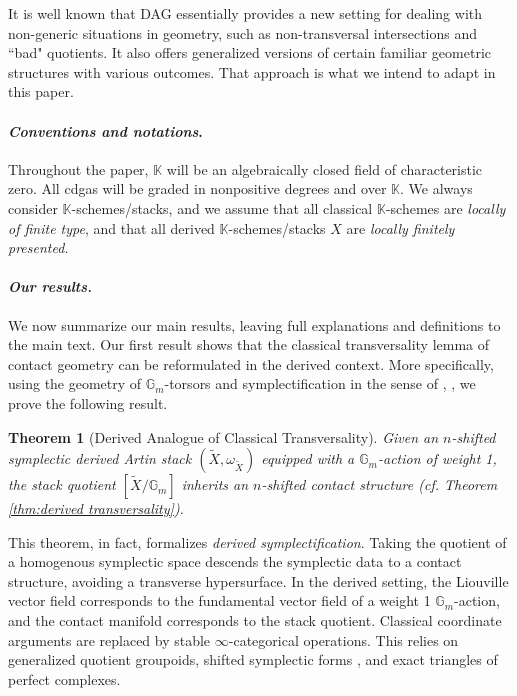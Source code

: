 \documentclass[reqno]{amsart}
\newtheorem{theorem}{Theorem}[section]
\theoremstyle{definition}
\theoremstyle{remark}
\newcommand{\Gm}{\mathbb{G}_m}
\newcommand{\K}{\mathbb{K}}
\newcommand{\bfem}[1]{\textbf{\textit{#1}}}
\begin{document}
It is well known that DAG essentially provides a new setting for dealing with non-generic situations in geometry, such as non-transversal intersections and “bad" quotients. It also offers generalized versions of certain familiar geometric structures with various outcomes. That approach is what we intend to adapt in this paper.
\vspace{0.05in}

\paragraph{\bfem{Conventions and notations}.} Throughout the paper, $ \mathbb{K} $ will be an algebraically closed field of characteristic zero. All cdgas will be graded in nonpositive degrees and  over $\mathbb{K}.$ We always consider $\K$-schemes/stacks, and we assume that all classical $ \K $-schemes are \textit{locally of finite type}, and that all derived $ \K $-schemes/stacks $ {X} $ are  \textit{locally finitely presented.}
\vspace{0.1in}

\paragraph{\bfem{Our results.}} We now summarize our main results, leaving full explanations and
definitions to the main text. Our first result shows that the classical transversality lemma of contact geometry can be reformulated in the derived context. More specifically, using the geometry of $\Gm$-torsors
and symplectification in the sense of \cite[Section 4.2]{Berktav1}, \cite[Theorem
4.1]{Berktav2}, we prove the following result.

\begin{theorem}[Derived Analogue of Classical Transversality]  \label{thm:A}
Given an $n$-shifted symplectic derived Artin stack $(\widetilde{X},
  \omega_{\widetilde{X}})$
  equipped with a $\Gm$-action of weight 1,
  the stack quotient $[\widetilde{X} / \Gm]$ inherits an
  $n$-shifted contact structure (cf. Theorem \ref{thm:derived transversality}).
\end{theorem}

This theorem, in fact, formalizes \textit{derived symplectification}. Taking the
quotient of a homogenous symplectic space descends the symplectic
data to a contact structure, avoiding
a transverse hypersurface. In the derived setting, the Liouville vector field corresponds to the
fundamental vector field of a weight 1 $\Gm$-action, and the
contact manifold corresponds to the stack quotient. Classical coordinate
arguments are replaced by stable $\infty$-categorical operations.
This relies on generalized quotient groupoids,
shifted symplectic forms \cite[Definition 1.18]{PTVV},
and exact triangles of perfect complexes.
\end{document}

